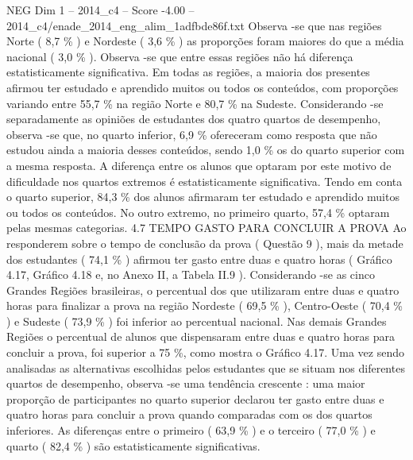 \begin{textsample}{NEG Dim 1 – 2014\_c4 – Score -4.00 – 2014\_c4/enade\_2014\_eng\_alim\_1adfbde86f.txt}
Observa -se que nas regiões Norte ( 8,7 \% ) e Nordeste ( 3,6 \% ) as proporções foram maiores do que a média nacional ( 3,0 \% ).
Observa -se que entre essas regiões não há diferença estatisticamente significativa.
Em todas as regiões, a maioria dos presentes afirmou ter estudado e aprendido muitos ou todos os conteúdos, com proporções variando entre 55,7 \% na região Norte e 80,7 \% na Sudeste.
Considerando -se separadamente as opiniões de estudantes dos quatro quartos de desempenho, observa -se que, no quarto inferior, 6,9 \% ofereceram como resposta que não estudou ainda a maioria desses conteúdos, sendo 1,0 \% os do quarto superior com a mesma resposta.
A diferença entre os alunos que optaram por este motivo de dificuldade nos quartos extremos é estatisticamente significativa.
Tendo em conta o quarto superior, 84,3 \% dos alunos afirmaram ter estudado e aprendido muitos ou todos os conteúdos.
No outro extremo, no primeiro quarto, 57,4 \% optaram pelas mesmas categorias. 4.7 TEMPO GASTO PARA CONCLUIR A PROVA Ao responderem sobre o tempo de conclusão da prova ( Questão 9 ), mais da metade dos estudantes ( 74,1 \% ) afirmou ter gasto entre duas e quatro horas ( Gráfico 4.17, Gráfico 4.18 e, no Anexo II, a Tabela II.9 ).
Considerando -se as cinco Grandes Regiões brasileiras, o percentual dos que utilizaram entre duas e quatro horas para finalizar a prova na região Nordeste ( 69,5 \% ), Centro-Oeste ( 70,4 \% ) e Sudeste ( 73,9 \% ) foi inferior ao percentual nacional.
Nas demais Grandes Regiões o percentual de alunos que dispensaram entre duas e quatro horas para concluir a prova, foi superior a 75 \%, como mostra o Gráfico 4.17.
Uma vez sendo analisadas as alternativas escolhidas pelos estudantes que se situam nos diferentes quartos de desempenho, observa -se uma tendência crescente : uma maior proporção de participantes no quarto superior declarou ter gasto entre duas e quatro horas para concluir a prova quando comparadas com os dos quartos inferiores.
As diferenças entre o primeiro ( 63,9 \% ) e o terceiro ( 77,0 \% ) e quarto ( 82,4 \% ) são estatisticamente significativas.

\end{textsample}
